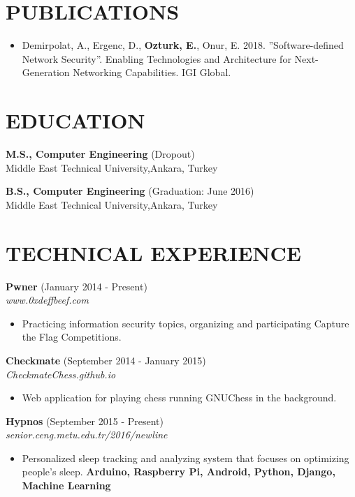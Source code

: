 \documentclass[margin, 10pt]{res} %
\begin{document}
\begin{resume}
        \section{PUBLICATIONS}
        \begin{itemize}
        		\item  Demirpolat, A., Ergenc, D., {\bf Ozturk, E.}, Onur, E. 2018. ”Software-defined Network Security”. Enabling Technologies and Architecture for Next-Generation Networking Capabilities. IGI Global.

        \end{itemize}
        
       \newpage

        \section{EDUCATION}

        {\bf M.S., Computer Engineering } \hfill {(Dropout)}\\
        Middle East Technical University,Ankara, Turkey

        {\bf B.S., Computer Engineering } \hfill {(Graduation: June 2016)}\\
        Middle East Technical University,Ankara, Turkey


        \section{TECHNICAL EXPERIENCE}

        {\bf Pwner} \hfill (January 2014 - Present) \\
        \textit{www.0xdeffbeef.com}
        \begin{itemize}
            \item Practicing information security topics, organizing and participating Capture the Flag Competitions.
        \end{itemize}

        {\bf Checkmate} \hfill (September 2014 - January 2015) \\
        \textit{CheckmateChess.github.io}
        \begin{itemize}
            \item Web application for playing chess running GNUChess in the background.
        \end{itemize}

       

        {\bf Hypnos} \hfill (September 2015 - Present) \\
        \textit{senior.ceng.metu.edu.tr/2016/newline}
        \begin{itemize}
            \item Personalized sleep tracking and analyzing system that focuses on optimizing people's sleep. {\bf Arduino, Raspberry Pi, Android, Python, Django, Machine Learning }
        \end{itemize}



\end{resume}
\end{document}
